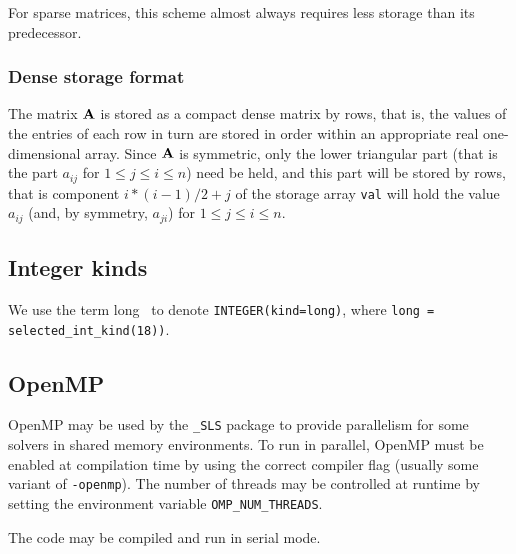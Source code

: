 \documentclass{galahad}
\newcommand{\packagename}{SLS}
\newcommand{\fullpackagename}{\libraryname\_\-\packagename}
\begin{document}
For sparse matrices, this scheme almost always requires less storage than
its predecessor.

\subsubsection{Dense storage format}\label{dense}
The matrix ${\mathbf{A}}$ is stored as a compact
dense matrix by rows, that is, the values of the entries of each row in turn are
stored in order within an appropriate real one-dimensional array.
Since ${\mathbf{A}}$ is symmetric, only the lower triangular part (that is the part
$a_{ij}$ for $1 \leq j \leq i \leq n$) need be held, and this part will be
stored by rows, that is component
$i \ast (i-1)/2 + j$ of the storage array {\tt val}
will hold the value $a_{ij}$ (and, by symmetry, $a_{ji}$)
for $1 \leq j \leq i \leq n$.



\subsection{Integer kinds}\label{Integer kinds}
We use the term
long \integer\ to denote {\tt INTEGER\-(kind=long)}, where
{\tt long = selected\_int\_kind(18))}.



\subsection{OpenMP}
OpenMP may be used by the {\tt \fullpackagename} package to provide
parallelism for some solvers in shared memory environments.
To run in parallel, OpenMP
must be enabled at compilation time by using the correct compiler flag
(usually some variant of {\tt -openmp}).
The number of threads may be controlled at runtime
by setting the environment variable {\tt OMP\_NUM\_THREADS}.

\noindent
The code may be compiled and run in serial mode.
\end{document}

